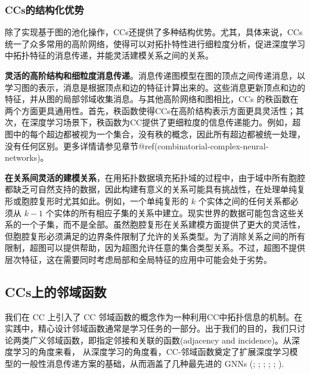 \documentclass[
  12pt,
]{krantz}
\begin{document}
\subsubsection{CCs的结构化优势}\label{structural-advantages-of-ccs}

除了实现基于图的池化操作，CCs还提供了多种结构优势。尤其，具体来说，CCs统一了众多常用的高阶网络，使得可以对拓扑特性进行细粒度分析，促进深度学习中拓扑特征的消息传递，并能灵活建模关系之间的关系。

\textbf{灵活的高阶结构和细粒度消息传递}。消息传递图模型在图的顶点之间传递消息，以学习图的表示，消息是根据顶点和边的特征计算出来的。这些消息更新顶点和边的特征，并从图的局部邻域收集消息。与其他高阶网络和图相比，CCs
的秩函数在两个方面更具通用性。首先，秩函数使得CCs在高阶结构表示方面更具灵活性；其次，在深度学习场景下，秩函数为CC提供了更细粒度的信息传递能力。例如，超图中的每个超边都被视为一个集合，没有秩的概念，因此所有超边都被统一处理，没有任何区别。更多详情请参见章节@ref(combinatorial-complex-neural-networks)。

\textbf{在关系间灵活的建模关系}，在用拓扑数据填充拓扑域的过程中，由于域中所有胞腔都缺乏可自然支持的数据，因此构建有意义的关系可能具有挑战性，在处理单纯复形或胞腔复形时尤其如此。例如，一个单纯复形的
\(k\) 个实体之间的任何关系都必须从 \(k-1\)
个实体的所有相应子集的关系中建立。现实世界的数据可能包含这些关系的一个子集，而不是全部。虽然胞腔复形在关系建模方面提供了更大的灵活性，但胞腔复形必须满足的边界条件限制了允许的关系类型。为了消除关系之间的所有限制，超图可以提供帮助，因为超图允许任意的集合类型关系。不过，超图不提供层次特征，这在需要同时考虑局部和全局特征的应用中可能会处于劣势。

\subsection{CCs上的邻域函数}\label{neighbourhood-functions-on-ccs}

我们在 CC 上引入了 CC
邻域函数的概念作为一种利用CC中拓扑信息的机制。在实践中，精心设计邻域函数通常是学习任务的一部分。出于我们的目的，我们只讨论两类广义邻域函数，即指定邻接和关联的函数(adjacency
and incidence)。从深度学习的角度来看，
从深度学习的角度看，CC-邻域函数奠定了扩展深度学习模型的一般性消息传递方案的基础，从而涵盖了几种最先进的
GNNs (;
;
;
;
;
).
\end{document}
